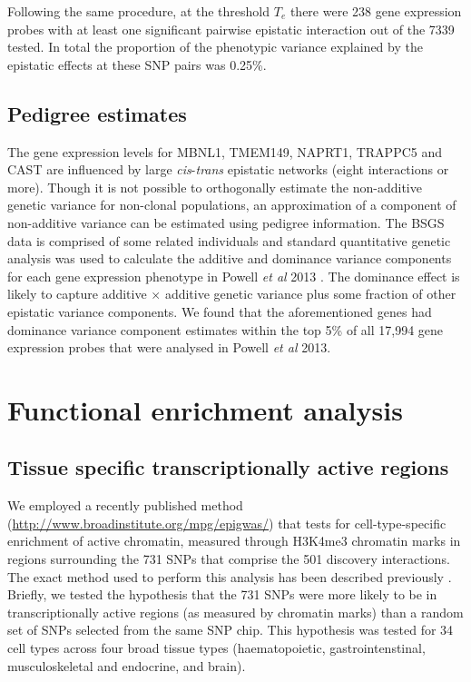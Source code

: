 \documentclass{article}
\begin{document}
Following the same procedure, at the threshold $T_{e}$ there were 238 gene expression probes with at least one significant pairwise epistatic interaction out of the 7339 tested. In total the proportion of the phenotypic variance explained by the epistatic effects at these SNP pairs was 0.25\%.


\subsection{Pedigree estimates}

The gene expression levels for MBNL1, TMEM149, NAPRT1, TRAPPC5 and CAST are influenced by large \emph{cis}-\emph{trans} epistatic networks (eight interactions or more). Though it is not possible to orthogonally estimate the non-additive genetic variance for non-clonal populations, an approximation of a component of non-additive variance can be estimated using pedigree information. The BSGS data is comprised of some related individuals and standard quantitative genetic analysis was used to calculate the additive and dominance variance components for each gene expression phenotype in Powell \emph{et al} 2013 \cite{Powell2013}. The dominance effect is likely to capture additive $\times$ additive genetic variance plus some fraction of other epistatic variance components. We found that the aforementioned genes had dominance variance component estimates within the top 5\% of all 17,994 gene expression probes that were analysed in Powell \emph{et al} 2013.


\section{Functional enrichment analysis}

\subsection{Tissue specific transcriptionally active regions}

We employed a recently published method (\url{http://www.broadinstitute.org/mpg/epigwas/}) \cite{Trynka2013} that tests for cell-type-specific enrichment of active chromatin, measured through H3K4me3 chromatin marks \cite{Koch2007} in regions surrounding the 731 SNPs that comprise the 501 discovery interactions. The exact method used to perform this analysis has been described previously \cite{Rietveld2013}. Briefly, we tested the hypothesis that the 731 SNPs were more likely to be in transcriptionally active regions (as measured by chromatin marks) than a random set of SNPs selected from the same SNP chip. This hypothesis was tested for 34 cell types across four broad tissue types (haematopoietic, gastrointenstinal, musculoskeletal and endocrine, and brain).
\end{document}
